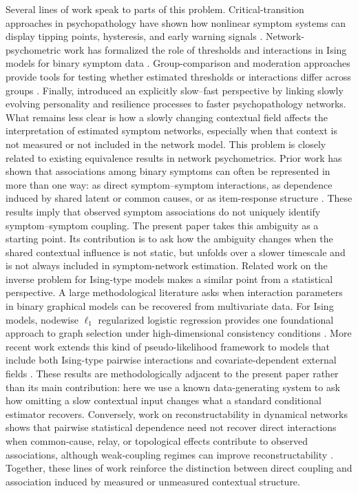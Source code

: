 \documentclass[man,12pt,floatsintext]{apa7}
\begin{document}
Several lines of work speak to parts of this problem. Critical-transition approaches in psychopathology have shown how nonlinear symptom systems can display tipping points, hysteresis, and early warning signals \parencite{van2014critical, scheffer2009early, helmich2021early}. Network-psychometric work has formalized the role of thresholds and interactions in Ising models for binary symptom data \parencite{van2014new, marsman2018introduction}. Group-comparison and moderation approaches provide tools for testing whether estimated thresholds or interactions differ across groups \parencite{van2023comparing, haslbeck2022estimating}. Finally, \textcite{lunansky2020personality} introduced an explicitly slow--fast perspective by linking slowly evolving personality and resilience processes to faster psychopathology networks. What remains less clear is how a slowly changing contextual field affects the interpretation of estimated symptom networks, especially when that context is not measured or not included in the network model.
This problem is closely related to existing equivalence results in network psychometrics. Prior work has shown that associations among binary symptoms can often be represented in more than one way: as direct symptom--symptom interactions, as dependence induced by shared latent or common causes, or as item-response structure \parencite{kruis2016three, marsman2018introduction, van2021latent}. These results imply that observed symptom associations do not uniquely identify symptom--symptom coupling. The present paper takes this ambiguity as a starting point. Its contribution is to ask how the ambiguity changes when the shared contextual influence is not static, but unfolds over a slower timescale and is not always included in symptom-network estimation.
Related work on the inverse problem for Ising-type models makes a similar point from a statistical perspective. A large methodological literature asks when interaction parameters in binary graphical models can be recovered from multivariate data. For Ising models, nodewise \(\ell_1\) regularized logistic regression provides one foundational approach to graph selection under high-dimensional consistency conditions \parencite{ravikumar2010high}. More recent work extends this kind of pseudo-likelihood framework to models that include both Ising-type pairwise interactions and covariate-dependent external fields \parencite{mukherjee2024logistic}. These results are methodologically adjacent to the present paper rather than its main contribution: here we use a known data-generating system to ask how omitting a slow contextual input changes what a standard conditional estimator recovers. Conversely, work on reconstructability in dynamical networks shows that pairwise statistical dependence need not recover direct interactions when common-cause, relay, or topological effects contribute to observed associations, although weak-coupling regimes can improve reconstructability \parencite{lunsmann2017transition}. Together, these lines of work reinforce the distinction between direct coupling and association induced by measured or unmeasured contextual structure.
\end{document}
